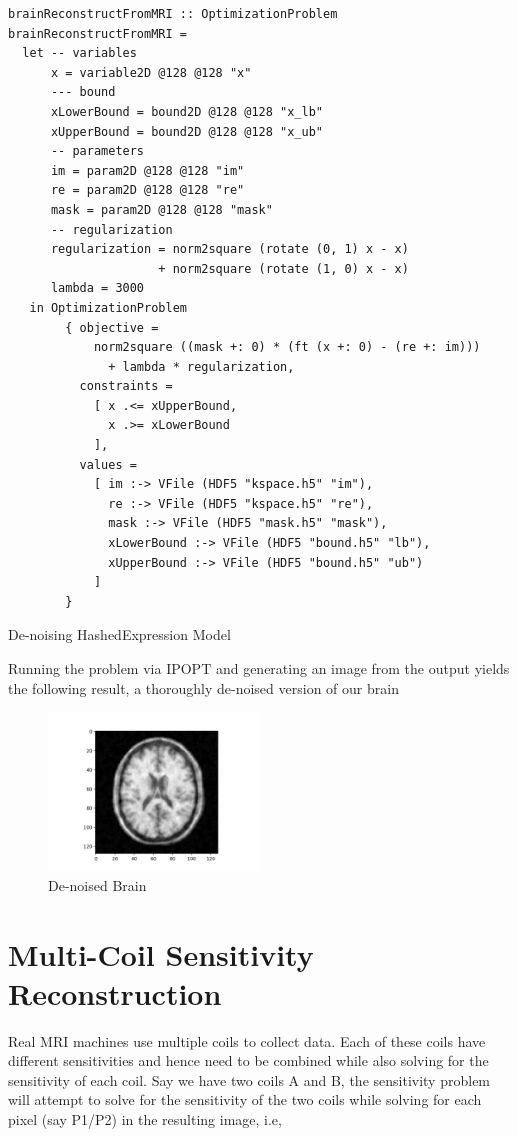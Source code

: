 \documentclass[11pt]{article}
\begin{document}
\begin{listing}[htbp]
\begin{verbatim}
brainReconstructFromMRI :: OptimizationProblem
brainReconstructFromMRI =
  let -- variables
      x = variable2D @128 @128 "x"
      --- bound
      xLowerBound = bound2D @128 @128 "x_lb"
      xUpperBound = bound2D @128 @128 "x_ub"
      -- parameters
      im = param2D @128 @128 "im"
      re = param2D @128 @128 "re"
      mask = param2D @128 @128 "mask"
      -- regularization
      regularization = norm2square (rotate (0, 1) x - x)
                     + norm2square (rotate (1, 0) x - x)
      lambda = 3000
   in OptimizationProblem
        { objective =
            norm2square ((mask +: 0) * (ft (x +: 0) - (re +: im)))
              + lambda * regularization,
          constraints =
            [ x .<= xUpperBound,
              x .>= xLowerBound
            ],
          values =
            [ im :-> VFile (HDF5 "kspace.h5" "im"),
              re :-> VFile (HDF5 "kspace.h5" "re"),
              mask :-> VFile (HDF5 "mask.h5" "mask"),
              xLowerBound :-> VFile (HDF5 "bound.h5" "lb"),
              xUpperBound :-> VFile (HDF5 "bound.h5" "ub")
            ]
        }
\end{verbatim}
\caption{De-noising HashedExpression Model}
\end{listing}

Running the problem via IPOPT and generating an image from the output yields
the following result, a thoroughly de-noised version of our brain

\begin{figure}[!htpb]
\centering
\includegraphics[width=0.5\textwidth]{figs/brain_after.png}
\caption{\label{fig:BrainAfter}De-noised Brain}
\end{figure}

\section{Multi-Coil Sensitivity Reconstruction}
\label{sec:orgf592721}
Real MRI machines use multiple coils to collect data. Each of these coils have
different sensitivities and hence need to be combined while also solving for
the sensitivity of each coil. Say we have two coils A and B, the sensitivity
problem will attempt to solve for the sensitivity of the two coils while
solving for each pixel (say P1/P2) in the resulting image, i.e,
\end{document}

